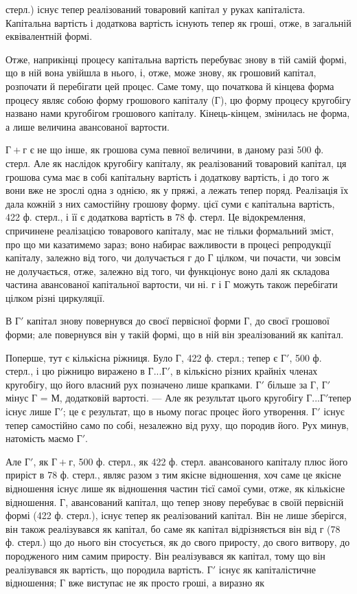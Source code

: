 \parcont{}  %
стерл.) існує тепер реалізований товаровий капітал у руках капіталіста.
Капітальна вартість і додаткова вартість існують тепер як гроші,
отже, в загальній еквівалентній формі.

Отже, наприкінці процесу капітальна вартість перебуває знову
в тій самій формі, що в ній вона увійшла в нього, і, отже, може знову,
як грошовий капітал, розпочати й перебігати цей процес. Саме тому, що
початкова й кінцева форма процесу являє собою форму грошового капіталу
(Г), цю форму процесу кругобігу названо нами кругобігом
грошового капіталу. Кінець-кінцем, змінилась не форма, а лише величина
авансованої вартости.

$Г + г$ є не що інше, як грошова сума певної величини, в даному разі
500 ф. стерл. Але як наслідок кругобігу капіталу, як реалізований
товаровий капітал, ця грошова сума має в собі капітальну вартість
і додаткову вартість, і до того ж вони вже не зрослі одна з однією, як
у пряжі, а лежать тепер поряд. Реалізація їх дала кожній з них самостійну
грошову форму.  цієї суми є капітальна вартість, 422 ф.
стерл., і  її є додаткова вартість в 78 ф. стерл. Це відокремлення,
спричинене реалізацією товарового капіталу, має не тільки формальний
зміст, про що ми казатимемо зараз; воно набирає важливости в процесі
репродукції капіталу, залежно від того, чи долучається г до Г цілком, чи
почасти, чи зовсім не долучається, отже, залежно від того, чи функціонує
воно далі як складова частина авансованої капітальної вартости, чи ні.
г і Г можуть також перебігати цілком різні циркуляції.

В $Г'$ капітал знову повернувся до своєї первісної форми Г, до своєї
грошової форми; але повернувся він у такій формі, що в ній він зреалізований
як капітал.

Поперше, тут є кількісна ріжниця. Було Г, 422 ф. стерл.; тепер є $Г'$,
500 ф. стерл., і цю ріжницю виражено в $Г... Г'$, в кількісно різних
крайніх членах кругобігу, що його власний рух позначено лише крапками.
$Г'$ більше за Г, $Г'$ мінус Г = М, додатковій вартості. — Але як результат цього
кругобігу $Г... Г' т$епер існує лише $Г'$; це є результат, що в ньому погас
процес його утворення. $Г'$ існує тепер самостійно само по собі, незалежно
від руху, що породив його. Рух минув, натомість маємо $Г'$.

Але $Г'$, як $Г + г$, 500 ф. стерл., як 422 ф. стерл. авансованого капіталу
плюс його приріст в 78 ф. стерл., являє разом з тим якісне відношення,
хоч саме це якісне відношення існує лише як відношення частин тієї
самої суми, отже, як кількісне відношення. Г, авансований капітал, що
тепер знову перебуває в своїй первісній формі (422 ф. стерл.), існує
тепер як реалізований капітал. Він не лише зберігся, він також реалізувався
як капітал, бо саме як капітал відрізняється він від г (78 ф. стерл.)
що до нього він стосується, як до свого приросту, до свого витвору, до
породженого ним самим приросту. Він реалізувався як капітал, тому що
він реалізувався як вартість, що породила вартість. $Г'$ існує як капіталістичне
відношення; Г вже виступає не як просто гроші, а виразно як
\parbreak{}  %
